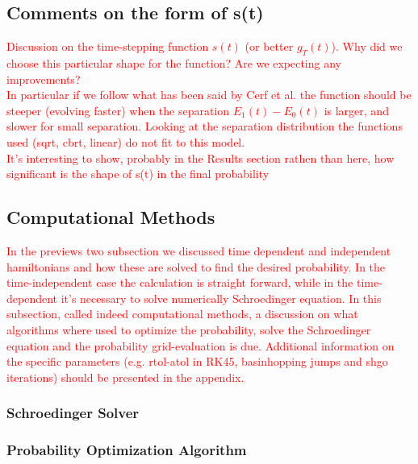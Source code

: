 \documentclass[aps,pra,reprint, onecolumn, showkeys]{revtex4-2}
\newcommand{\red}[1]{\textcolor{red}{#1}}
\begin{document}
\subsection{Comments on the form of s(t)}
\red{Discussion on the time-stepping function $s(t)$ (or better  $g_T(t)$). Why did we choose this particular shape for the function? Are we expecting any improvements? \\ In particular if we follow what has been said by Cerf et al. the function should be steeper (evolving faster) when the separation $E_1(t)-E_0(t)$ is larger, and slower for small separation. Looking at the separation distribution the functions used (sqrt, cbrt, linear) do not fit to this model. \\ It's interesting to show, probably in the Results section rathen than here, how significant is the shape of s(t) in the final probability}


\subsection{Computational Methods}
\red{In the previews two subsection we discussed time dependent and independent hamiltonians and how these are solved to find the desired probability. In the time-independent case the calculation is straight forward, while in the time-dependent it's necessary to solve numerically Schroedinger equation. In this subsection, called indeed computational methods, a discussion on what algorithms where used to optimize the probability, solve the Schroedinger equation and the probability grid-evaluation is due. Additional information on the specific parameters (e.g. rtol-atol in RK45, basinhopping jumps and shgo iterations) should be presented in the appendix.}\\
\subsubsection{Schroedinger Solver}

\subsubsection{Probability Optimization Algorithm}
\end{document}
